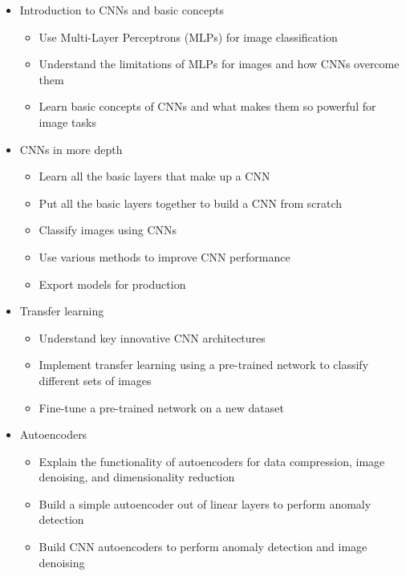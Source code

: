 \begin{itemize}
    \item Introduction to CNNs and basic concepts

\begin{itemize}
        \item Use Multi-Layer Perceptrons (MLPs) for image classification
        \item Understand the limitations of MLPs for images and how CNNs overcome them
        \item Learn basic concepts of CNNs and what makes them so powerful for image tasks
\end{itemize}

    \item CNNs in more depth

\begin{itemize}
        \item Learn all the basic layers that make up a CNN
        \item Put all the basic layers together to build a CNN from scratch
        \item Classify images using CNNs
        \item Use various methods to improve CNN performance
        \item Export models for production
\end{itemize}

    \item Transfer learning

\begin{itemize}
        \item Understand key innovative CNN architectures
        \item Implement transfer learning using a pre-trained network to classify different sets of images
        \item Fine-tune a pre-trained network on a new dataset
\end{itemize}

    \item Autoencoders

\begin{itemize}
        \item Explain the functionality of autoencoders for data compression, image denoising, and dimensionality reduction
        \item Build a simple autoencoder out of linear layers to perform anomaly detection
        \item Build CNN autoencoders to perform anomaly detection and image denoising
\end{itemize}


\end{itemize}
